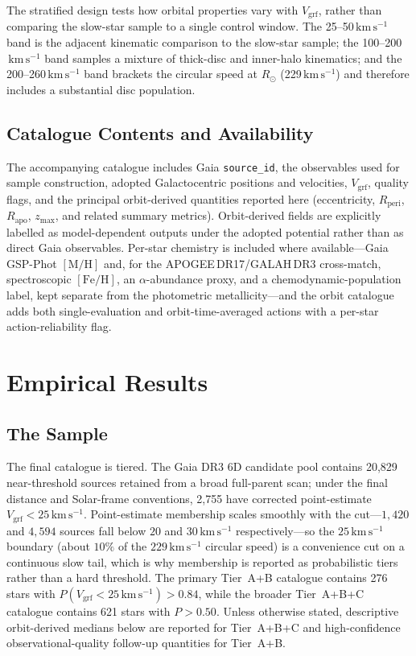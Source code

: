 \documentclass{aa}  %
\newcommand{\vgrf}{\ensuremath{V_{\mathrm{grf}}}\xspace}
\newcommand{\kms}{\ensuremath{\,\mathrm{km\,s^{-1}}}\xspace}
\newcommand{\Rperi}{R_{\mathrm{peri}}}
\newcommand{\Rapo}{R_{\mathrm{apo}}}
\newcommand{\zmax}{z_{\mathrm{max}}}
\newcommand{\Rsun}{R_{\odot}}
\newcommand{\FeH}{\ensuremath{[\mathrm{Fe}/\mathrm{H}]}}
\newcommand{\MH}{\ensuremath{[\mathrm{M}/\mathrm{H}]}}
\begin{document}
The stratified design tests how orbital properties vary with $\vgrf$,
rather than comparing the slow-star sample to a single control window.
The 25--50\kms{} band is the adjacent kinematic comparison to the
slow-star sample; the 100--200\kms{} band samples a mixture of
thick-disc and inner-halo kinematics; and the 200--260\kms{} band
brackets the circular speed at $\Rsun$ (229\kms) and therefore includes
a substantial disc population.

\subsection{Catalogue Contents and Availability} \label{sec:catalogue}

The accompanying catalogue includes Gaia \texttt{source\_id}, the
observables used for sample construction, adopted Galactocentric
positions and velocities, $\vgrf$, quality flags, and the principal
orbit-derived quantities reported here (eccentricity, $\Rperi$, $\Rapo$,
$\zmax$, and related summary metrics).  Orbit-derived fields are
explicitly labelled as model-dependent outputs under the adopted
potential rather than as direct Gaia observables.  Per-star chemistry is
included where available---Gaia GSP-Phot \MH{} and, for the
APOGEE\,DR17/GALAH\,DR3 cross-match, spectroscopic \FeH{}, an
$\alpha$-abundance proxy, and a chemodynamic-population label, kept
separate from the photometric metallicity---and the orbit catalogue adds
both single-evaluation and orbit-time-averaged actions with a per-star
action-reliability flag.

\section{Empirical Results} \label{sec:empirical}

\subsection{The Sample} \label{sec:sample}

The final catalogue is tiered.  The Gaia DR3 6D candidate pool
contains 20{,}829 near-threshold sources retained from a broad
full-parent scan; under the final distance and Solar-frame conventions,
2{,}755 have corrected point-estimate $\vgrf<25$\kms.  Point-estimate
membership scales smoothly with the cut---$1{,}420$ and $4{,}594$ sources
fall below $20$ and $30$\kms{} respectively---so the $25$\kms{} boundary
(about $10\%$ of the $229$\kms{} circular speed) is a convenience cut on a
continuous slow tail, which is why membership is reported as probabilistic
tiers rather than a hard threshold.  The primary
Tier~A+B catalogue contains 276 stars with
$P(\vgrf<25\kms)>0.84$, while the broader Tier~A+B+C catalogue contains
621 stars with $P>0.50$.  Unless otherwise stated, descriptive
orbit-derived medians below are reported for Tier~A+B+C and
high-confidence observational-quality follow-up quantities for Tier~A+B.
\end{document}
